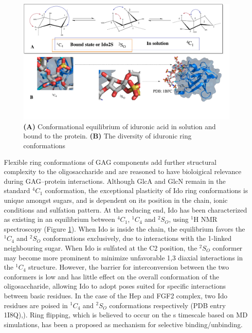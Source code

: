\documentclass[journal=jctcce,manuscript=article]{achemso}
\begin{document}
{\begin{figure}[tl!]
\includegraphics[width=12cm]{ido_confs.pdf}
\caption{\textbf{(A)} Conformational equilibrium of iduronic acid in solution and bound to the protein. \textbf{(B)} The diversity of iduronic ring conformations }
\label{fig:ido_confs}
\end{figure}

Flexible ring conformations of \ac{GAG} components add further structural complexity to the oligosaccharide and are reasoned to have bioloigical relevance during \ac{GAG}--protein interactions.\cite{Sattelle2013DoesHeparanome} 
Although \ac{GlcA} and \ac{GlcN} remain in the standard $^{4}C_{1}$ conformation, the exceptional plasticity of \ac{Ido} ring conformations is unique amongst sugars, and is dependent on its position in the chain, ionic conditions and sulfation pattern.\cite{Capila2002Heparin-proteinInteractions., vanBoeckel1987ConformationalAcid}
At the reducing end, \ac{Ido} has been characterized as existing in an equilibrium between $^{4}C_{1}$, $^{1}C_{4}$ and $^{2}S_{O}$, using $^{1}$H NMR spectroscopy (Figure \ref{fig:ido_confs}).\cite{Ferro1986EvidenceStudies, vanBoeckel1987ConformationalAcid} 
When \ac{Ido} is inside the chain, the equilibrium favors the $^{1}C_{4}$ and $^{2}S_{O}$ conformations exclusively, due to interactions with the 1-linked neighbouring sugar.\cite{vanBoeckel1987ConformationalAcid} 
When \ac{Ido} is sulfated at the C2 position, the $^{2}S_{O}$ conformer may become more prominent to minimize unfavorable 1,3 diaxial interactions in the $^{1}C_{4}$ structure.\cite{Hsieh2016UncoveringSulphateb} However, the barrier for interconversion between the two conformers is low and has little effect on the overall conformation of the oligosaccharide, allowing \ac{Ido} to adopt poses suited for specific interactions between basic residues. \cite{Capila2002Heparin-proteinInteractions.} In the case of the \ac{Hep} and \ac{FGF2} complex, two \ac{Ido} residues are poised in $^{1}C_{4}$ and $^{2}S_{O}$ conformations respectively (\ac{PDB} entry 1I8Q),).\cite{Faham1996HeparinFactor} 
Ring flipping, which is believed to occur on the \textmu s timescale based on \ac{MD} simulations, has been a proposed as mechanism for selective binding/unbinding.\cite{Sattelle2012DependenceIdopyranosides} 

}
\end{document}
